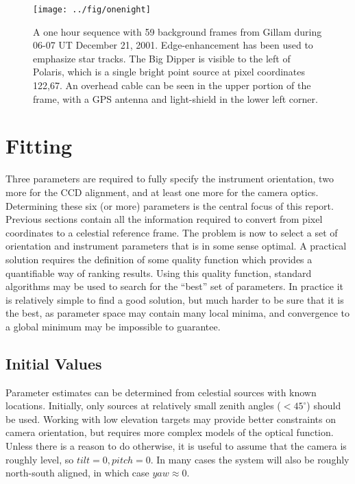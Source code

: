 \documentclass[11pt,twoside]{article}   %
\begin{document}
\begin{figure}[hbt!]
 \centering
  \texttt{[image: ../fig/onenight]}
    \caption[A one hour sequence.]
   {A one hour sequence with 59 background frames from Gillam
   during 06-07 UT December 21, 2001.  Edge-enhancement has
   been used to emphasize star tracks.
   The Big Dipper is visible to the left of Polaris, which is
   a single bright point source at pixel coordinates 122,67.
   An overhead cable can be seen in the upper portion
   of the frame, with a GPS antenna and light-shield in the lower left corner.
     \label{fig:onenight}  }
\end{figure}


\newpage
\section{Fitting} \label{sec:fitting}

Three parameters are required to fully specify the instrument
orientation, two more for the CCD alignment, and at least one more
for the camera optics.  Determining these six (or more) parameters
is the central focus of this report.  Previous sections contain
all the information required to convert from pixel coordinates to
a celestial reference frame.  The problem is now to select a set
of orientation and instrument parameters that is in some sense
optimal.  A practical solution requires the definition of some
quality function which provides a quantifiable way of ranking
results.  Using this quality function, standard algorithms may be
used to search for the ``best'' set of parameters.  In practice it
is relatively simple to find a good solution, but much harder to
be sure that it is the best, as parameter space may contain many
local minima, and convergence to a global minimum may be
impossible to guarantee.


 \subsection{Initial Values}

Parameter estimates can be determined from celestial sources with
known locations. Initially, only sources at relatively small
zenith angles ($<45^\circ$) should be used.  Working with low
elevation targets may provide better constraints on camera
orientation, but requires more complex models of the optical
function.  Unless there is a reason to do otherwise, it is useful
to assume that the camera is roughly level, so $tilt=0, pitch=0$.
In many cases the system will also be roughly north-south aligned,
in which case $yaw \approx 0$.
\end{document}
